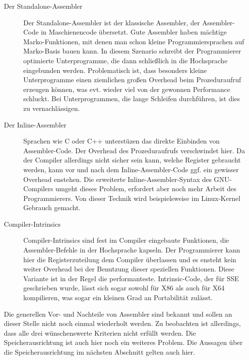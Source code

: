 \documentclass[a4paper,10pt]{article}
\begin{document}
\begin{description}

    \item[Der Standalone-Assembler] Der Standalone-Assembler ist der klassische Assembler, der
    Assembler-Code in Maschienencode übersetzt. Gute Assembler haben mächtige Marko-Funktionen, mit
    denen man schon kleine Programmiersprachen auf Marko-Basis bauen kann. In diesem Szenario
    schreibt der Programmierer optimierte Unterprogramme, die dann schließlich in die Hochsprache
    eingebunden werden. Problematisch ist, dass besonders kleine Unterprogramme einen ziemlichen
    großen Overhead beim Prozeduraufruf erzeugen können, was evt. wieder viel von der gewonnen
    Performance schluckt. Bei Unterprogrammen, die lange Schleifen durchführen, ist dies zu
    vernachlässigen.

    \item[Der Inline-Assembler] Sprachen wie C oder C++ unterstüzen das direkte Einbinden von
    Assembler-Code.  Der Overhead des Prozeduraufrufs verschwindet hier. Da der Compiler allerdings
    nicht sicher sein kann, welche Register gebraucht werden, kann vor und nach dem
    Inline-Assembler-Code ggf. ein gewisser Overhead enstehen. Die erweiterte
    Inline-Assembler-Syntax des GNU-Compilers umgeht dieses Problem, erfordert aber noch mehr
    Arbeit des Programmierers. Von dieser Technik wird beispielsweise im Linux-Kernel Gebrauch
    gemacht.

    \item[Compiler-Intrinsics] Compiler-Intrinsics sind fest im Compiler eingebaute Funktionen, die
    Assembler-Befehle in der Hochsprache kapseln. Der Programmierer kann hier die Registerzuteilung
    dem Compiler überlassen und es ensteht kein weiter Overhead bei der Benutzung dieser speziellen
    Funktionen. Diese Variante ist in der Regel die performanteste.  Intrinsic-Code, der für SSE
    geschrieben wurde, lässt sich sogar sowohl für X86 als auch für X64 kompilieren, was sogar ein
    kleinen Grad an Portabilität zulässt.

\end{description}

Die generellen Vor- und Nachteile von Assembler sind bekannt und sollen an dieser Stelle nicht noch
einmal wiederholt werden. Zu beobachten ist allerdings, dass alle drei wünschenswerte Kriterien
nicht erfüllt werden. Die Speicherausrichtung ist auch hier noch ein weiteres Problem. Die Aussagen
über die Speicherausrichtung im nächsten Abschnitt gelten auch hier.
\end{document}
